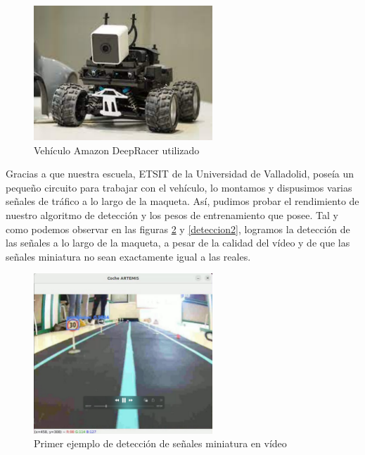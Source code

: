 \begin{figure}[H]
    \centering
 	\includegraphics[width=0.6\textwidth]{Imagenes/IA/deepracer.pdf}
    \caption{Vehículo Amazon DeepRacer utilizado}
    \label{deepracer}
\end{figure}

Gracias a que nuestra escuela, ETSIT de la Universidad de Valladolid, poseía un pequeño circuito para trabajar con el vehículo, lo montamos y dispusimos varias señales de tráfico a lo largo de la maqueta. Así, pudimos probar el rendimiento de nuestro algoritmo de detección y los pesos de entrenamiento que posee. Tal y como podemos observar en las figuras \ref{deteccion1} y \ref{deteccion2}, logramos la detección de las señales a lo largo de la maqueta, a pesar de la calidad del vídeo y de que las señales miniatura no sean exactamente igual a las reales. \\

\begin{figure}[H]
    \centering
 	\includegraphics[width=0.6\textwidth]{Imagenes/IA/deteccion1.pdf}
    \caption{Primer ejemplo de detección de señales miniatura en vídeo}
    \label{deteccion1}
\end{figure}


